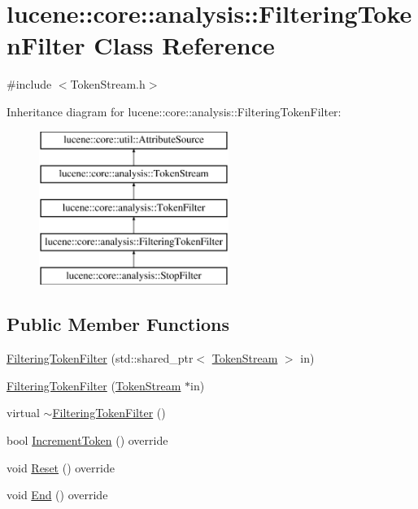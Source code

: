 \hypertarget{classlucene_1_1core_1_1analysis_1_1FilteringTokenFilter}{}\section{lucene\+:\+:core\+:\+:analysis\+:\+:Filtering\+Token\+Filter Class Reference}
\label{classlucene_1_1core_1_1analysis_1_1FilteringTokenFilter}


{\ttfamily \#include $<$Token\+Stream.\+h$>$}

Inheritance diagram for lucene\+:\+:core\+:\+:analysis\+:\+:Filtering\+Token\+Filter\+:\begin{figure}[H]
\begin{center}
\leavevmode
\includegraphics[height=5.000000cm]{classlucene_1_1core_1_1analysis_1_1FilteringTokenFilter}
\end{center}
\end{figure}
\subsection*{Public Member Functions}
\begin{DoxyCompactItemize}
\item 
\mbox{\hyperlink{classlucene_1_1core_1_1analysis_1_1FilteringTokenFilter_ac5ae5016927281bfd3cff1161b3a36b4}{Filtering\+Token\+Filter}} (std\+::shared\+\_\+ptr$<$ \mbox{\hyperlink{classlucene_1_1core_1_1analysis_1_1TokenStream}{Token\+Stream}} $>$ in)
\item 
\mbox{\hyperlink{classlucene_1_1core_1_1analysis_1_1FilteringTokenFilter_a6ad64db0fcf39d585e28c8f1d44f7617}{Filtering\+Token\+Filter}} (\mbox{\hyperlink{classlucene_1_1core_1_1analysis_1_1TokenStream}{Token\+Stream}} $\ast$in)
\item 
virtual \mbox{\hyperlink{classlucene_1_1core_1_1analysis_1_1FilteringTokenFilter_a52769c366f866d8d48fe2bdb1a438f50}{$\sim$\+Filtering\+Token\+Filter}} ()
\item 
bool \mbox{\hyperlink{classlucene_1_1core_1_1analysis_1_1FilteringTokenFilter_aa1956aa94779023b3f97b667bd819734}{Increment\+Token}} () override
\item 
void \mbox{\hyperlink{classlucene_1_1core_1_1analysis_1_1FilteringTokenFilter_ab85e4deab22d9dedd7ccb7b1f4750400}{Reset}} () override
\item 
void \mbox{\hyperlink{classlucene_1_1core_1_1analysis_1_1FilteringTokenFilter_adf6b7aac9634afdffe1800a369753688}{End}} () override
\end{DoxyCompactItemize}
